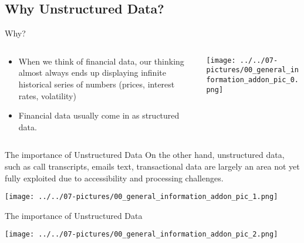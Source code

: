 \documentclass[11pt]{beamer}
\begin{document}
\subsection{Why Unstructured Data?}
%
\begin{frame}{Why?}
\begin{columns}[T] %
\begin{column}{.48\textwidth}
		\begin{itemize}
		\item When we think of financial data, our thinking almost always ends up displaying infinite historical series of numbers (prices, interest rates, volatility) 
		\item Financial data usually come in as structured data. 
		\end{itemize}
\end{column}%
\hfill%
\begin{column}{.48\textwidth}
		\texttt{[image: ../../07-pictures/00\_general\_information\_addon\_pic\_0.png]}
\end{column}%
\end{columns}
\end{frame}
\begin{frame}{The importance of Unstructured Data}
	 On the other hand, unstructured data, such as call transcripts, emails text, transactional data are largely an area not yet fully exploited due to accessibility and processing challenges.
	\begin{center}
	\texttt{[image: ../../07-pictures/00\_general\_information\_addon\_pic\_1.png]}
	\end{center}
\end{frame}
\begin{frame}{The importance of Unstructured Data}
	\begin{center}
	\texttt{[image: ../../07-pictures/00\_general\_information\_addon\_pic\_2.png]}
	\end{center}
\end{frame}
%
\end{document}
